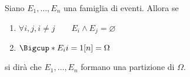 \documentclass{subfiles}
\begin{document}
Siano \(E_{1}, \ldots, E_{n}\) una famiglia di eventi. Allora se
\begin{enumerate}
    \item \(\forall i, j, i \neq j \qquad E_{i} \land E_{j} = \varnothing\)
    \item \(\Bigcup*{E_{i}}{i = 1}[n] = \Omega\)
\end{enumerate}
si dirà che \(E_{1}, \ldots, E_{n}\) formano una partizione di \(\Omega\).
\end{document}
